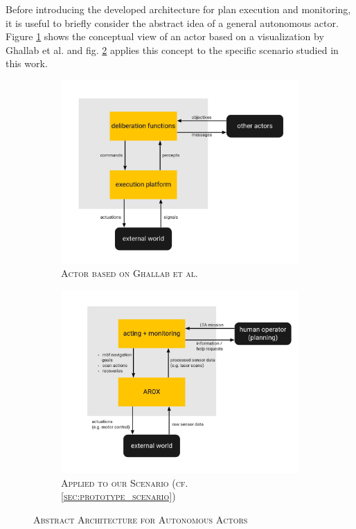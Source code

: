 \documentclass[english, master, utf8]{base/thesis_KBS}
\begin{document}
Before introducing the developed architecture for plan execution and monitoring, it is useful to briefly consider the abstract idea of a general autonomous actor. Figure
\ref{fig:GNT_actor} shows the conceptual view of an actor based on a visualization by Ghallab et al. and fig. \ref{fig:MSC_actor} applies this concept to the specific scenario
studied in this work.
\begin{figure}[H]
    \centering
    \begin{subfigure}[b]{0.49\textwidth}
        \centering
        \includegraphics[width=\textwidth]{pics/GNT_actor.png}
        \caption{\textsc{Actor based on Ghallab et al. \cite{GNT:2016}}}
        \label{fig:GNT_actor}
    \end{subfigure}
    \hfill
    \begin{subfigure}[b]{0.49\textwidth}
        \centering
        \includegraphics[width=\textwidth]{pics/MSC_actor.png}
        \caption{\textsc{Applied to our Scenario (cf. \ref{sec:prototype_scenario})}}
        \label{fig:MSC_actor}
    \end{subfigure}
\caption{\textsc{Abstract Architecture for Autonomous Actors}}
\label{fig:prototype_sim}
\end{figure}
\end{document}
